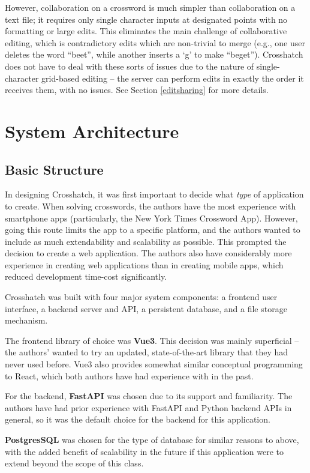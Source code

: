 \documentclass{article}
\begin{document}
However, collaboration on a crossword is much simpler than collaboration on a text file; it requires only
single character inputs at designated points with no formatting or large edits. This eliminates the main challenge of collaborative editing,
which is contradictory edits which are non-trivial to merge (e.g., one user deletes the word ``beet'', while another inserts a `g' to make ``beget'').
Crosshatch does not have to deal with these sorts of issues due to the nature of single-character grid-based editing -- the server can perform edits in
exactly the order it receives them, with no issues. See Section \ref{editsharing} for more details.

\section{System Architecture}
\subsection{Basic Structure}

In designing Crosshatch, it was first important to decide what \textit{type} of application to create. When solving crosswords, the authors have the most
experience with smartphone apps (particularly, the New York Times Crossword App). However, going this route limits the app to a
specific platform, and the authors wanted to include as much extendability and scalability as possible. This
prompted the decision to create a web application. The authors also have considerably more experience in creating web applications
than in creating mobile apps, which reduced development time-cost significantly.

Crosshatch was built with four major system components: a frontend user interface, a backend server and API, a persistent database,
and a file storage mechanism.

The frontend library of choice was \textbf{Vue3}. This decision was mainly superficial -- the authors' wanted to try an updated, state-of-the-art library
that they had never used before. Vue3 also provides somewhat similar conceptual programming to React, which both authors have had experience with in the past.

For the backend, \textbf{FastAPI} was chosen due to its support and familiarity. The authors have had prior experience with FastAPI and Python backend APIs in general, so it was the default choice for the backend for this application.

\textbf{PostgresSQL} was chosen for the type of database for similar reasons to above, with the added benefit of scalability in the
future if this application were to extend beyond the scope of this class.
\end{document}
